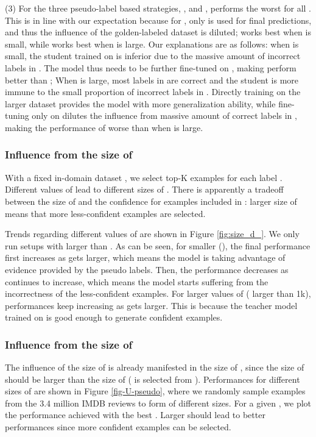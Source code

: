 \documentclass[11pt,a4paper]{article}
\begin{document}
(3) For the three pseudo-label based strategies, ,  and , 
 performs the worst for all .  This is in line with our expectation because for ,  only  is used for final predictions, and thus the influence of the golden-labeled dataset  is diluted;
 works best  
when  is small, while 
 works best when  is large.
Our explanations are as follows: 
when  is small,  the student trained on  is inferior due to the massive amount of incorrect labels in . 
The model thus needs to be further fine-tuned on , making  
perform better than ; 
When  is large, most labels in  are correct and
the student is more immune to the small proportion of incorrect labels in . 
Directly training on the larger  dataset provides the model with more generalization ability,
while fine-tuning only on  dilutes the influence from massive amount of correct labels in , making the performance of 
  worse than  when  is large. 

\subsubsection{Influence from the size of }
With a fixed in-domain dataset , we select top-K examples for each label .
Different values of  lead to different sizes of . 
There is apparently a tradeoff between the size of  and the confidence for examples included in :
larger size of  means that more less-confident examples are selected.

Trends regarding different values of 
are shown in Figure \ref{fig:size_d_}.
We only run setups with   larger than . 
As can be seen, for smaller  (), the final performance first increases as  gets larger, which means the model is taking  advantage of evidence provided by the pseudo labels. Then, the performance decreases as  continues to increase, which means the model starts suffering from the incorrectness of the less-confident examples. 
For larger values of  ( larger than 1k),  performances keep increasing as  gets larger. This is because the teacher model trained on  is good enough to generate confident examples. 



\subsubsection{Influence from the size of }
The influence of the size of  is 
already 
 manifested in the size of , since the size of  should be larger than the size of  ( is selected from ). 
 Performances for different sizes of  are shown in Figure \ref{fig-U-pseudo}, where we randomly sample examples from the 3.4 million IMDB reviews to form  of different sizes. 
 For a given , we plot the performance achieved with the best . 
 Larger  should lead to better performances since more confident examples can be selected.
 
\end{document}
